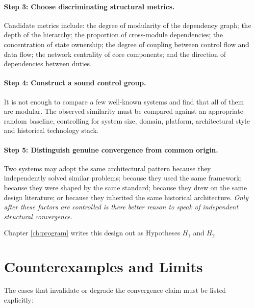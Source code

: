 \paragraph{Step 3: Choose discriminating structural metrics.}
Candidate metrics include: the degree of modularity of the dependency graph; the depth of
the hierarchy; the proportion of cross-module dependencies; the concentration of state
ownership; the degree of coupling between control flow and data flow; the network centrality
of core components; and the direction of dependencies between duties.

\paragraph{Step 4: Construct a sound control group.}
It is not enough to compare a few well-known systems and find that all of them are modular.
The observed similarity must be compared against an appropriate random baseline, controlling
for system size, domain, platform, architectural style and historical technology stack.

\paragraph{Step 5: Distinguish genuine convergence from common origin.}
Two systems may adopt the same architectural pattern because they independently solved
similar problems; because they used the same framework; because they were shaped by the same
standard; because they drew on the same design literature; or because they inherited the
same historical architecture. \emph{Only after these factors are controlled is there better
reason to speak of independent structural convergence.}

Chapter \ref{ch:program} writes this design out as Hypotheses $H_1$ and $H_2$.

\section{Counterexamples and Limits}\label{sec:limits}

The cases that invalidate or degrade the convergence claim must be listed explicitly:


